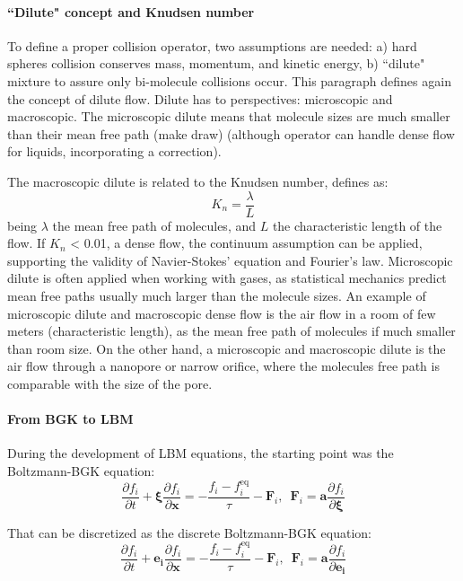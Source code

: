 \documentclass{article}
\begin{document}
	\paragraph{``Dilute" concept and Knudsen number} To define a proper collision operator, two assumptions are needed: a) hard spheres collision conserves mass, momentum, and kinetic energy, b) ``dilute" mixture to assure only bi-molecule collisions occur. This paragraph defines again the concept of dilute flow. Dilute has to perspectives: microscopic and macroscopic. The microscopic dilute means that molecule sizes are much smaller than their mean free path (make draw) (although operator can handle dense flow for liquids, incorporating a correction).
	
	The macroscopic dilute is related to the Knudsen number, defines as:
	\begin{equation}
		K_n = \frac{\lambda}{L}
	\end{equation}
	being $\lambda$ the mean free path of molecules, and $L$ the characteristic length of the flow. If $K_n$ < 0.01, a dense flow, the continuum assumption can be applied, supporting the validity of Navier-Stokes' equation and Fourier's law. Microscopic dilute is often applied when working with gases, as statistical mechanics predict mean free paths usually much larger than the molecule sizes. An example of microscopic dilute and macroscopic dense flow is the air flow in a room of few meters (characteristic length), as the mean free path of molecules if much smaller than room size. On the other hand, a microscopic and macroscopic dilute is the air flow through a nanopore or narrow orifice, where the molecules free path is comparable with the size of the pore. 
	
	
	\paragraph{From BGK to LBM} During the development of LBM equations, the starting point was the Boltzmann-BGK equation:
	\begin{equation}
		\frac{\partial f_i}{\partial t} + \pmb{\xi} \frac{\partial f_i}{\partial \mathbf{x}} = -\frac{f_i - f^{\text{eq}}_i}{\tau} - \mathbf{F}_i, \, \, \, \mathbf{F}_i = \mathbf{a} \frac{\partial f_i}{\partial \pmb{\xi}}
	\end{equation}

	That can be discretized as the discrete Boltzmann-BGK equation:
	\begin{equation}
		\frac{\partial f_i}{\partial t} + \mathbf{e_i} \frac{\partial f_i}{\partial \mathbf{x}} = -\frac{f_i - f^{\text{eq}}_i}{\tau} - \mathbf{F}_i, \, \, \, \mathbf{F}_i = \mathbf{a} \frac{\partial f_i}{\partial \mathbf{e_i}}
	\end{equation}
	
\end{document}
